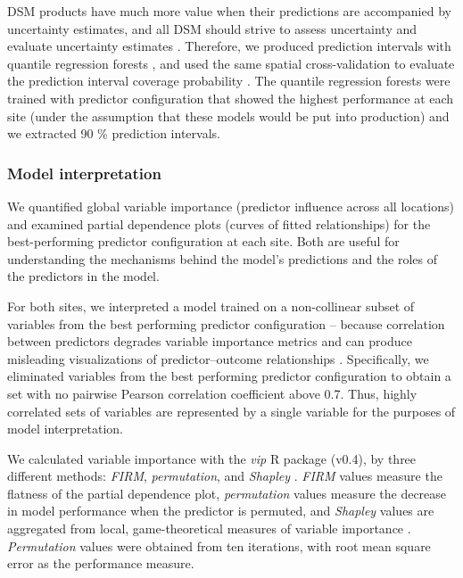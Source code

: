 \documentclass[soil, manuscript]{copernicus}
\begin{document}
DSM products have much more value when their predictions are accompanied by uncertainty estimates, and all DSM should strive to assess uncertainty \citep{arrouaysImpressionsDigitalSoil2020, wadouxMachineLearningDigital2020} and evaluate uncertainty estimates \citep{heuvelinkSpatialStatisticsSoil2022}.
Therefore, we produced prediction intervals with quantile regression forests \citep{meinshausenQuantileRegressionForests2006}, and used the same spatial cross-validation to evaluate the prediction interval coverage probability \citep{shresthaMachineLearningApproaches2006}.
The quantile regression forests were trained with predictor configuration that showed the highest performance at each site (under the assumption that these models would be put into production) and we extracted 90 \% prediction intervals.

\subsubsection{Model interpretation}

We quantified global variable importance (predictor influence across all locations) and examined partial dependence plots (curves of fitted relationships) for the best-performing predictor configuration at each site.
Both are useful for understanding the mechanisms behind the model's predictions and the roles of the predictors in the model.

For both sites, we interpreted a model trained on a non-collinear subset of variables from the best performing predictor configuration -- because correlation between predictors degrades variable importance metrics \citep{stroblConditionalVariableImportance2008, biauRandomForestGuided2016} and can produce misleading visualizations of predictor--outcome relationships \citep{biecekExplanatoryModelAnalysis2021, dwivediExplainableAIXAI2023}.
Specifically, we eliminated variables from the best performing predictor configuration to obtain a set with no pairwise Pearson correlation coefficient above 0.7.
Thus, highly correlated sets of variables are represented by a single variable for the purposes of model interpretation.

We calculated variable importance with the \emph{vip} R package (v0.4), by three different methods: \emph{FIRM}, \emph{permutation}, and \emph{Shapley} \citep{greenwellVariableImportancePlots2020}.
\emph{FIRM} values measure the flatness of the partial dependence plot, \emph{permutation} values measure the decrease in model performance when the predictor is permuted, and \emph{Shapley} values are aggregated from local, game-theoretical measures of variable importance \citep{greenwellVariableImportancePlots2020}.
\emph{Permutation} values were obtained from ten iterations, with root mean square error as the performance measure.
\end{document}
